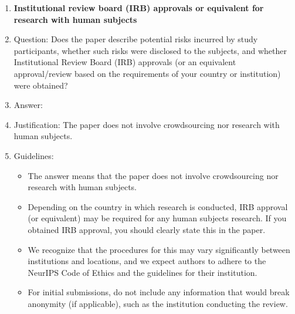 \documentclass{article}
\begin{document}
\begin{enumerate}
\item {\bf Institutional review board (IRB) approvals or equivalent for research with human subjects}
    \item[] Question: Does the paper describe potential risks incurred by study participants, whether such risks were disclosed to the subjects, and whether Institutional Review Board (IRB) approvals (or an equivalent approval/review based on the requirements of your country or institution) were obtained?
    \item[] Answer: \answerNA{} %
    \item[] Justification: The paper does not involve crowdsourcing nor research with human subjects.
    \item[] Guidelines:
    \begin{itemize}
        \item The answer \answerNA{} means that the paper does not involve crowdsourcing nor research with human subjects.
        \item Depending on the country in which research is conducted, IRB approval (or equivalent) may be required for any human subjects research. If you obtained IRB approval, you should clearly state this in the paper.
        \item We recognize that the procedures for this may vary significantly between institutions and locations, and we expect authors to adhere to the NeurIPS Code of Ethics and the guidelines for their institution.
        \item For initial submissions, do not include any information that would break anonymity (if applicable), such as the institution conducting the review.
    \end{itemize}


\end{enumerate}
\end{document}
